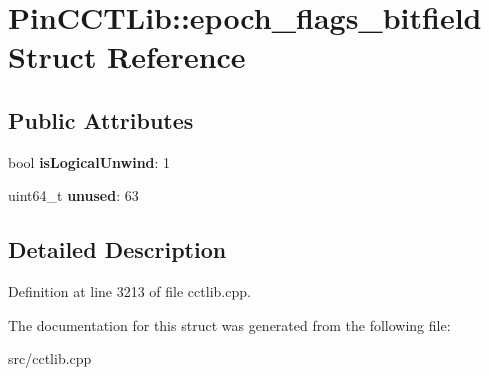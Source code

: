 \hypertarget{structPinCCTLib_1_1epoch__flags__bitfield}{\section{Pin\-C\-C\-T\-Lib\-:\-:epoch\-\_\-flags\-\_\-bitfield Struct Reference}
\label{structPinCCTLib_1_1epoch__flags__bitfield}
}
\subsection*{Public Attributes}
\begin{DoxyCompactItemize}
\item 
\hypertarget{structPinCCTLib_1_1epoch__flags__bitfield_a7f323f3526838e41384b9acba81ac432}{bool {\bfseries is\-Logical\-Unwind}\-: 1}\label{structPinCCTLib_1_1epoch__flags__bitfield_a7f323f3526838e41384b9acba81ac432}

\item 
\hypertarget{structPinCCTLib_1_1epoch__flags__bitfield_a7fc7888493fcc9f20fc87814b2a4f855}{uint64\-\_\-t {\bfseries unused}\-: 63}\label{structPinCCTLib_1_1epoch__flags__bitfield_a7fc7888493fcc9f20fc87814b2a4f855}

\end{DoxyCompactItemize}


\subsection{Detailed Description}


Definition at line 3213 of file cctlib.\-cpp.



The documentation for this struct was generated from the following file\-:\begin{DoxyCompactItemize}
\item 
src/cctlib.\-cpp\end{DoxyCompactItemize}
